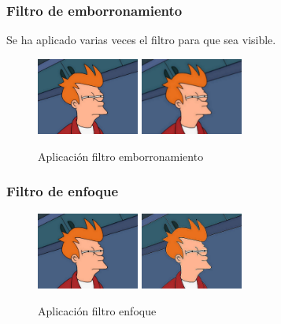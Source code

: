 \subsubsection{Filtro de emborronamiento}
Se ha aplicado varias veces el filtro para que sea visible.
\vskip0.3cm
\begin{figure}[H]
 \centering
  \includegraphics[width=0.3\textwidth]{imagenes/Fry.jpg}
  \includegraphics[width=0.3\textwidth]{imagenes/fryEmborronamiento.jpg}
 \caption{Aplicación filtro emborronamiento}
 \label{diseño}
\end{figure}
\subsubsection{Filtro de enfoque}
\vskip0.3cm
\begin{figure}[H]
 \centering
  \includegraphics[width=0.3\textwidth]{imagenes/Fry.jpg}
  \includegraphics[width=0.3\textwidth]{imagenes/fryEnfoque.jpg}
 \caption{Aplicación filtro enfoque}
 \label{diseño}
\end{figure}

